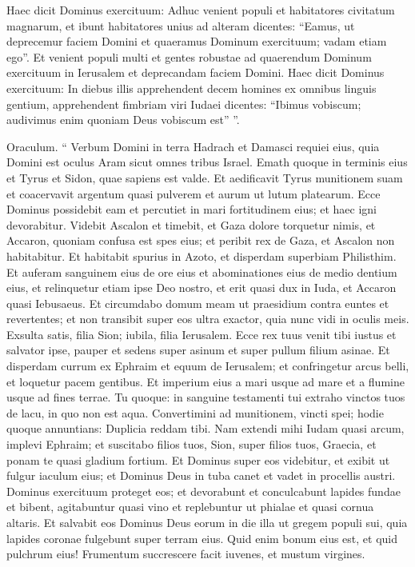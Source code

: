 \begin{biblechapter}
\begin{biblechapter}
\begin{biblechapter}
\begin{biblechapter}
\begin{biblechapter}
\begin{biblechapter}
\begin{biblechapter}
\begin{biblechapter}
\verse Haec dicit Dominus exercituum: Adhuc venient populi et habitatores civitatum magnarum, 
\verse et ibunt habitatores unius ad alteram dicentes: “Eamus, ut deprecemur faciem Domini et quaeramus Dominum exercituum; vadam etiam ego”. 
\verse Et venient populi multi et gentes robustae ad quaerendum Dominum exercituum in Ierusalem et deprecandam faciem Domini.
 \verse Haec dicit Dominus exercituum: In diebus illis apprehendent decem homines ex omnibus linguis gentium, apprehendent fimbriam viri Iudaei dicentes: “Ibimus vobiscum; audivimus enim quoniam Deus vobiscum est” ”.
 
\begin{biblechapter}
\verse Oraculum.
 “ Verbum Domini in terra Hadrach
 et Damasci requiei eius,
 quia Domini est oculus Aram
 sicut omnes tribus Israel.
 \verse Emath quoque in terminis eius
 et Tyrus et Sidon, quae sapiens est valde.
 \verse Et aedificavit Tyrus munitionem suam
 et coacervavit argentum quasi pulverem
 et aurum ut lutum platearum.
 \verse Ecce Dominus possidebit eam
 et percutiet in mari fortitudinem eius;
 et haec igni devorabitur.
 \verse Videbit Ascalon et timebit,
 et Gaza dolore torquetur nimis,
 et Accaron, quoniam confusa est spes eius;
 et peribit rex de Gaza,
 et Ascalon non habitabitur.
 \verse Et habitabit spurius in Azoto,
 et disperdam superbiam Philisthim.
 \verse Et auferam sanguinem eius de ore eius
 et abominationes eius de medio dentium eius,
 et relinquetur etiam ipse Deo nostro,
 et erit quasi dux in Iuda,
 et Accaron quasi Iebusaeus.
 \verse Et circumdabo domum meam ut praesidium
 contra euntes et revertentes;
 et non transibit super eos ultra exactor,
 quia nunc vidi in oculis meis.
 \verse Exsulta satis, filia Sion;
 iubila, filia Ierusalem.
 Ecce rex tuus venit tibi
 iustus et salvator ipse,
 pauper et sedens super asinum
 et super pullum filium asinae.
 \verse Et disperdam currum ex Ephraim
 et equum de Ierusalem;
 et confringetur arcus belli,
 et loquetur pacem gentibus.
 Et imperium eius a mari usque ad mare
 et a flumine usque ad fines terrae.
 \verse Tu quoque: in sanguine testamenti tui
 extraho vinctos tuos de lacu,
 in quo non est aqua.
 \verse Convertimini ad munitionem,
 vincti spei;
 hodie quoque annuntians:
 Duplicia reddam tibi.
 \verse Nam extendi mihi Iudam quasi arcum,
 implevi Ephraim;
 et suscitabo filios tuos, Sion,
 super filios tuos, Graecia,
 et ponam te quasi gladium fortium.
 \verse Et Dominus super eos videbitur,
 et exibit ut fulgur iaculum eius;
 et Dominus Deus in tuba canet
 et vadet in procellis austri.
 \verse Dominus exercituum proteget eos;
 et devorabunt et conculcabunt lapides fundae
 et bibent, agitabuntur quasi vino
 et replebuntur ut phialae et quasi cornua altaris.
 \verse Et salvabit eos Dominus Deus eorum
 in die illa
 ut gregem populi sui,
 quia lapides coronae
 fulgebunt super terram eius.
 \verse Quid enim bonum eius est,
 et quid pulchrum eius!
 Frumentum succrescere facit iuvenes,
 et mustum virgines.
 

\end{biblechapter}
\end{biblechapter}
\end{biblechapter}
\end{biblechapter}
\end{biblechapter}
\end{biblechapter}
\end{biblechapter}
\end{biblechapter}
\end{biblechapter}
